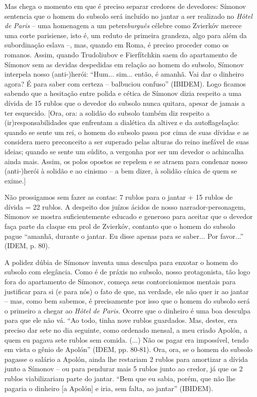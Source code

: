 Mas chega o momento em que é preciso separar credores de devedores:
Símonov sentencia que o homem do subsolo será incluído no jantar a ser
realizado no \emph{Hôtel de Paris} -- uma homenagem a um
peters\emph{burguês} célebre como Zvierkóv merece uma corte parisiense,
isto é, um reduto de primeira grandeza, algo para além da subordinação
eslava --, mas, quando em Roma, é preciso proceder como os romanos.
Assim, quando Trudoliubov e Fierfítchkin saem do apartamento de Símonov
sem as devidas despedidas em relação ao homem do subsolo, Símonov
interpela nosso (anti-)herói: ``Hum... sim... então, é amanhã. Vai dar o
dinheiro agora? É para saber com certeza -- balbuciou confuso''
(IBIDEM). Logo ficamos sabendo que a hesitação entre polida e cética de
Símonov dizia respeito a uma dívida de 15 rublos que o devedor do
subsolo nunca quitara, apesar de jamais a ter esquecido. {[}Ora, ora: a
solidão do subsolo também diz respeito a (ir)responsabilidades que
enfrentam a dialética da altivez e da autoflagelação: quando se sente um
rei, o homem do subsolo passa por cima de suas dívidas e as considera
mero preconceito a ser superado pelas alturas do reino inefável de suas
ideias; quando se sente um súdito, a vergonha por ser um devedor o
achincalha ainda mais. Assim, os polos opostos se repelem e se atraem
para condenar nosso (anti-)herói à solidão e ao cinismo -- a bem dizer,
à solidão cínica de quem se exime.{]}

Não prossigamos sem fazer as contas: 7 rublos para o jantar + 15 rublos
de dívida = 22 rublos. A despeito dos juízos ácidos de nosso
narrador-personagem, Símonov se mostra suficientemente educado e
generoso para aceitar que o devedor faça parte da claque em prol de
Zvierkóv, contanto que o homem do subsolo pague ``amanhã, durante o
jantar. Eu disse apenas para se saber... Por favor...'' (IDEM, p. 80).

A polidez dúbia de Símonov inventa uma desculpa para enxotar o homem do
subsolo com elegância. Como é de práxis no subsolo, nosso protagonista,
tão logo fora do apartamento de Símonov, começa seus contorcionismos
mentais para justificar para si (e para nós) o fato de que, na verdade,
ele não quer ir ao jantar -- mas, como bem sabemos, é precisamente por
isso que o homem do subsolo será o primeiro a chegar ao \emph{Hôtel de
Paris.} Ocorre que o dinheiro é uma boa desculpa para que ele não vá.
``Ao todo, tinha nove rublos guardados. Mas, destes, era preciso dar
sete no dia seguinte, como ordenado mensal, a meu criado Apolón, a quem
eu pagava sete rublos sem comida. (...) Não os pagar era impossível,
tendo em vista o gênio de Apolón'' (IDEM, pp. 80-81). Ora, ora, se o
homem do subsolo pagasse o salário a Apolón, ainda lhe restariam 2
rublos para amortizar a dívida junto a Símonov -- ou para pendurar mais
5 rublos junto ao credor, já que os 2 rublos viabilizariam parte do
jantar. ``Bem que eu sabia, porém, que não lhe pagaria o dinheiro {[}a
Apolón{]} e iria, sem falta, ao jantar'' (IBIDEM).

